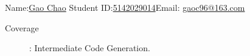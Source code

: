 \documentclass[12pt,a4paper]{article}
\begin{document}
\noindent

\noindent{}
\begin{center}
\footnotesize{\color{blue} \quad Name:\underline{Gao Chao}  \quad Student ID:\underline {5142029014}\quad Email: \underline {gaoc96@163.com}}
\end{center}

\begin{description}
	\item[Coverage]: Intermediate Code Generation.
\end{description}
\end{document}
